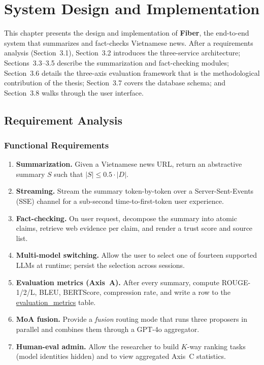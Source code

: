 \chapter{System Design and Implementation}

This chapter presents the design and implementation of \textbf{Fiber}, the
end-to-end system that summarizes and fact-checks Vietnamese news. After a
requirements analysis (Section~3.1), Section~3.2 introduces the three-service
architecture; Sections~3.3--3.5 describe the summarization and
fact-checking modules; Section~3.6 details the three-axis evaluation
framework that is the methodological contribution of the thesis;
Section~3.7 covers the database schema; and Section~3.8 walks through the
user interface.

\section{Requirement Analysis}

\subsection{Functional Requirements}

\begin{enumerate}
  \item \textbf{Summarization.} Given a Vietnamese news URL, return an
        abstractive summary $S$ such that $|S| \leq 0.5 \cdot |D|$.
  \item \textbf{Streaming.} Stream the summary token-by-token over a
        Server-Sent-Events (SSE) channel for a sub-second time-to-first-token
        user experience.
  \item \textbf{Fact-checking.} On user request, decompose the summary into
        atomic claims, retrieve web evidence per claim, and render a trust
        score and source list.
  \item \textbf{Multi-model switching.} Allow the user to select one of
        fourteen supported LLMs at runtime; persist the selection across
        sessions.
  \item \textbf{Evaluation metrics (Axis~A).} After every summary, compute
        ROUGE-1/2/L, BLEU, BERTScore, compression rate, and write a row to
        the \url{evaluation_metrics} table.
  \item \textbf{MoA fusion.} Provide a \textit{fusion} routing mode that
        runs three proposers in parallel and combines them through a
        GPT-4o aggregator.
  \item \textbf{Human-eval admin.} Allow the researcher to build $K$-way
        ranking tasks (model identities hidden) and to view aggregated
        Axis~C statistics.
\end{enumerate}

